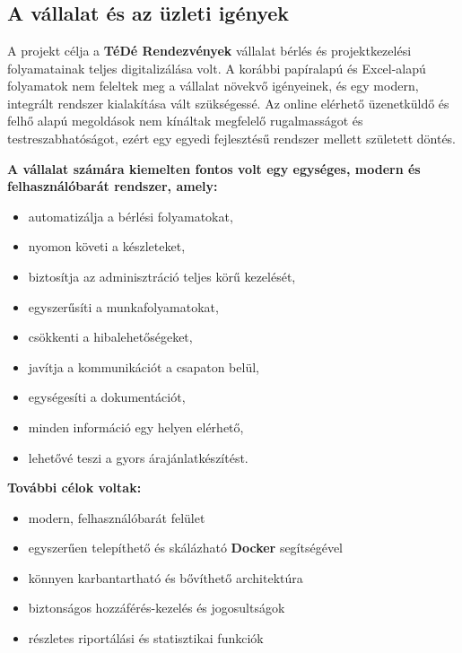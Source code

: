 \chapter{\projectoverview}
\section{A vállalat és az üzleti igények}

A projekt célja a \textbf{TéDé Rendezvények} vállalat bérlés és projektkezelési folyamatainak teljes digitalizálása volt. 
A korábbi papíralapú és Excel-alapú folyamatok nem feleltek meg a vállalat növekvő igényeinek,
és egy modern, integrált rendszer kialakítása vált szükségessé. Az online elérhető üzenetküldő és felhő alapú megoldások
nem kínáltak megfelelő rugalmasságot és testreszabhatóságot, ezért egy egyedi fejlesztésű rendszer mellett született döntés.

\textbf{A vállalat számára kiemelten fontos volt egy egységes, modern és felhasználóbarát rendszer, amely:}
\begin{itemize}
    \item automatizálja a bérlési folyamatokat,
    \item nyomon követi a készleteket,
    \item biztosítja az adminisztráció teljes körű kezelését,
    \item egyszerűsíti a munkafolyamatokat,
    \item csökkenti a hibalehetőségeket,
    \item javítja a kommunikációt a csapaton belül,
    \item egységesíti a dokumentációt,
    \item minden információ egy helyen elérhető,
    \item lehetővé teszi a gyors árajánlatkészítést.
\end{itemize}

\pagebreak
\textbf{További célok voltak:}
\begin{itemize}
    \item modern, felhasználóbarát felület
    \item egyszerűen telepíthető és skálázható \textbf{Docker} segítségével
    \item könnyen karbantartható és bővíthető architektúra
    \item biztonságos hozzáférés-kezelés és jogosultságok
    \item részletes riportálási és statisztikai funkciók
\end{itemize}

